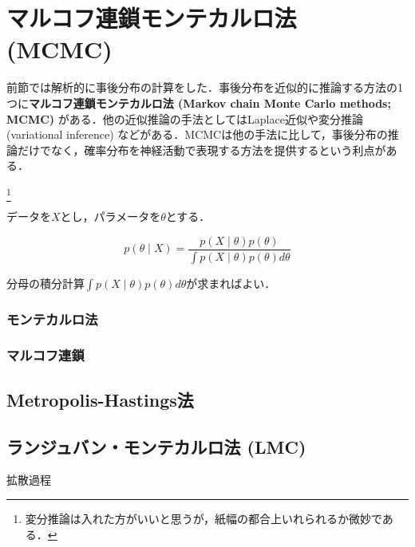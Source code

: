 \section{マルコフ連鎖モンテカルロ法 (MCMC)}
前節では解析的に事後分布の計算をした．事後分布を近似的に推論する方法の1つに\textbf{マルコフ連鎖モンテカルロ法 (Markov chain Monte Carlo methods; MCMC)} がある．他の近似推論の手法としてはLaplace近似や変分推論 (variational inference) などがある．MCMCは他の手法に比して，事後分布の推論だけでなく，確率分布を神経活動で表現する方法を提供するという利点がある．

\footnote{
変分推論は入れた方がいいと思うが，紙幅の都合上いれられるか微妙である．
}

データを$X$とし，パラメータを$\theta$とする．


\begin{equation}
p(\theta\mid X)=\frac{p(X\mid \theta)p(\theta)}{\int p(X\mid \theta)p(\theta)d\theta}
\end{equation}


分母の積分計算$\int p(X\mid \theta)p(\theta)d\theta$が求まればよい．

\subsubsection{モンテカルロ法}

\subsubsection{マルコフ連鎖}
\subsection{Metropolis-Hastings法}










\subsection{ランジュバン・モンテカルロ法 (LMC)}
拡散過程


